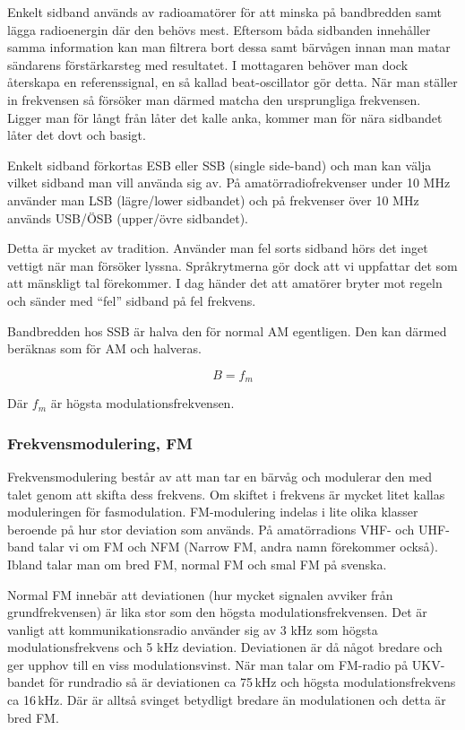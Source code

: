Enkelt sidband används av radioamatörer för att minska på bandbredden samt
lägga radioenergin där den behövs mest. Eftersom båda sidbanden innehåller
samma information kan man filtrera bort dessa samt bärvågen innan man matar
sändarens förstärkarsteg med resultatet. I mottagaren behöver man dock
återskapa en referenssignal, en så kallad beat-oscillator gör detta. När man
ställer in frekvensen så försöker man därmed matcha den ursprungliga
frekvensen. Ligger man för långt från låter det kalle anka, kommer man för
nära sidbandet låter det dovt och basigt.

Enkelt sidband förkortas ESB eller SSB (single side-band) och man kan välja
vilket sidband man vill använda sig av. På amatörradiofrekvenser under 10 MHz
använder man LSB (lägre/lower sidbandet) och på frekvenser över 10 MHz används
USB/ÖSB (upper/övre sidbandet).

Detta är mycket av tradition. Använder man fel sorts sidband hörs det inget
vettigt när man försöker lyssna. Språkrytmerna gör dock att vi uppfattar det
som att mänskligt tal förekommer. I dag händer det att amatörer bryter mot
regeln och sänder med ``fel'' sidband på fel frekvens.

Bandbredden hos SSB är halva den för normal AM egentligen. Den kan därmed
beräknas som för AM och halveras.

$$B=f_m$$

Där $f_m$ är högsta modulationsfrekvensen.

\subsubsection{Frekvensmodulering, FM}

Frekvensmodulering består av att man tar en bärvåg och modulerar den med talet
genom att skifta dess frekvens. Om skiftet i frekvens är mycket litet kallas
moduleringen för fasmodulation. FM-modulering indelas i lite olika klasser
beroende på hur stor deviation som används. På amatörradions VHF- och UHF-band
talar vi om FM och NFM (Narrow FM, andra namn förekommer också). Ibland talar
man om bred FM, normal FM och smal FM på svenska.

Normal FM innebär att deviationen (hur mycket signalen avviker från
grundfrekvensen) är lika stor som den högsta modulationsfrekvensen. Det är
vanligt att kommunikationsradio använder sig av 3 kHz som högsta
modulationsfrekvens och 5 kHz deviation. Deviationen är då något bredare och ger
upphov till en viss modulationsvinst. När man talar om FM-radio på UKV-bandet
för rundradio så är deviationen ca 75\,kHz och högsta modulationsfrekvens ca
16\,kHz. Där är alltså svinget betydligt bredare än modulationen och detta är
bred FM.

